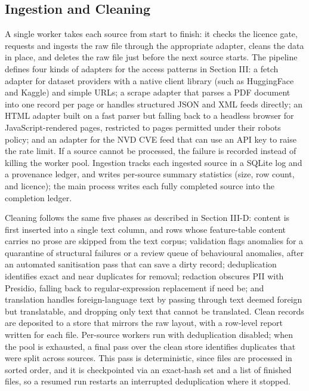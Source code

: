\documentclass[conference]{IEEEtran}
\begin{document}
\subsection{Ingestion and Cleaning}

A single worker takes each source from start to finish: it checks the licence gate, requests and ingests the raw file through the appropriate adapter, cleans the data in place, and deletes the raw file just before the next source starts. The pipeline defines four kinds of adapters for the access patterns in Section III: a fetch adapter for dataset providers with a native client library (such as HuggingFace and Kaggle) and simple URLs; a scrape adapter that parses a PDF document into one record per page or handles structured JSON and XML feeds directly; an HTML adapter built on a fast parser but falling back to a headless browser for JavaScript-rendered pages, restricted to pages permitted under their robots policy; and an adapter for the NVD CVE feed that can use an API key to raise the rate limit. If a source cannot be processed, the failure is recorded instead of killing the worker pool. Ingestion tracks each ingested source in a SQLite log and a provenance ledger, and writes per-source summary statistics (size, row count, and licence); the main process writes each fully completed source into the completion ledger.

Cleaning follows the same five phases as described in Section III-D: content is first inserted into a single text column, and rows whose feature-table content carries no prose are skipped from the text corpus; validation flags anomalies for a quarantine of structural failures or a review queue of behavioural anomalies, after an automated sanitisation pass that can save a dirty record; deduplication identifies exact and near duplicates for removal; redaction obscures PII with Presidio, falling back to regular-expression replacement if need be; and translation handles foreign-language text by passing through text deemed foreign but translatable, and dropping only text that cannot be translated. Clean records are deposited to a store that mirrors the raw layout, with a row-level report written for each file. Per-source workers run with deduplication disabled; when the pool is exhausted, a final pass over the clean store identifies duplicates that were split across sources. This pass is deterministic, since files are processed in sorted order, and it is checkpointed via an exact-hash set and a list of finished files, so a resumed run restarts an interrupted deduplication where it stopped.
\end{document}

